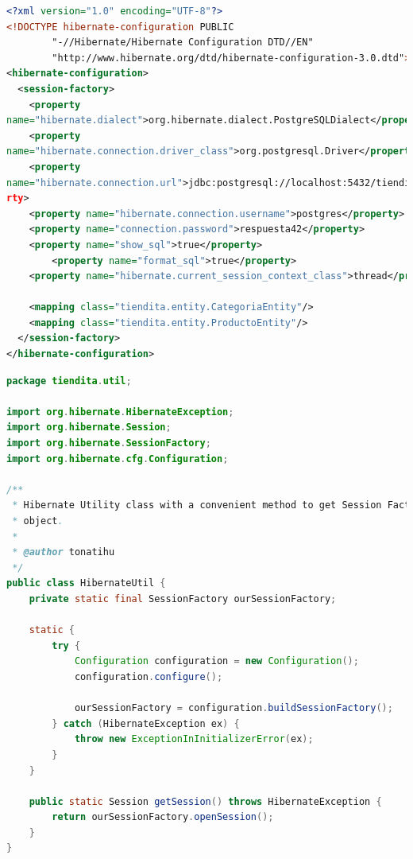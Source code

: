 \documentclass[a4paper,12pt]{article}
\begin{document}
\begin{lstlisting}[language=XML, style=customXML, 
caption={hibernate.cfg.xml}, captionpos=b,basicstyle=\fontfamily{cmss}\small]
<?xml version="1.0" encoding="UTF-8"?>
<!DOCTYPE hibernate-configuration PUBLIC
        "-//Hibernate/Hibernate Configuration DTD//EN"
        "http://www.hibernate.org/dtd/hibernate-configuration-3.0.dtd">
<hibernate-configuration>
  <session-factory>
    <property 
name="hibernate.dialect">org.hibernate.dialect.PostgreSQLDialect</property>
    <property 
name="hibernate.connection.driver_class">org.postgresql.Driver</property>
    <property 
name="hibernate.connection.url">jdbc:postgresql://localhost:5432/tiendita</prope
rty>
    <property name="hibernate.connection.username">postgres</property>
    <property name="connection.password">respuesta42</property>
    <property name="show_sql">true</property>
        <property name="format_sql">true</property>
    <property name="hibernate.current_session_context_class">thread</property>
    
    <mapping class="tiendita.entity.CategoriaEntity"/>
    <mapping class="tiendita.entity.ProductoEntity"/>
  </session-factory>
</hibernate-configuration>
\end{lstlisting}

\begin{lstlisting}[language=Java, style=customJava, 
caption={HibernateUtil.java}, captionpos=b,basicstyle=\fontfamily{cmss}\small]
package tiendita.util;

import org.hibernate.HibernateException;
import org.hibernate.Session;
import org.hibernate.SessionFactory;
import org.hibernate.cfg.Configuration;

/**
 * Hibernate Utility class with a convenient method to get Session Factory
 * object.
 *
 * @author tonatihu
 */
public class HibernateUtil {
    private static final SessionFactory ourSessionFactory;

    static {
        try {
            Configuration configuration = new Configuration();
            configuration.configure();

            ourSessionFactory = configuration.buildSessionFactory();
        } catch (HibernateException ex) {
            throw new ExceptionInInitializerError(ex);
        }
    }

    public static Session getSession() throws HibernateException {
        return ourSessionFactory.openSession();
    }
}
\end{lstlisting}
\end{document}
